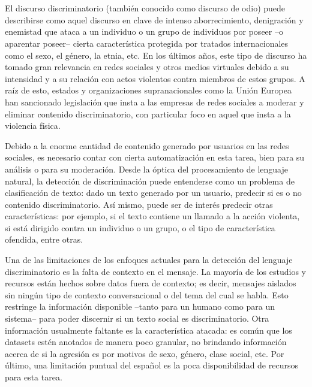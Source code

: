 \chapter*{\runtitulo}

\noindent El discurso discriminatorio (también conocido como discurso de odio) puede describirse como aquel discurso en clave de intenso aborrecimiento, denigración y enemistad que ataca a un individuo o un grupo de individuos por poseer –o aparentar poseer– cierta característica protegida por tratados internacionales como el sexo, el género, la etnia, etc. En los últimos años, este tipo de discurso ha tomado gran relevancia en redes sociales y otros medios virtuales debido a su intensidad y a su relación con actos violentos contra miembros de estos grupos. A raíz de esto, estados y organizaciones supranacionales como la Unión Europea han sancionado legislación que insta a las empresas de redes sociales a moderar y eliminar contenido discriminatorio, con particular foco en aquel que insta a la violencia física.

Debido a la enorme cantidad de contenido generado por usuarios en las redes sociales, es necesario contar con cierta automatización en esta tarea, bien para su análisis o para su moderación. Desde la óptica del procesamiento de lenguaje natural, la detección de discriminación puede entenderse como un problema de clasificación de texto: dado un texto generado por un usuario, predecir si es o no contenido discriminatorio. Así mismo, puede ser de interés predecir otras características: por ejemplo, si el texto contiene un llamado a la acción violenta, si está dirigido contra un individuo o un grupo, o el tipo de característica ofendida, entre otras.

Una de las limitaciones de los enfoques actuales para la detección del lenguaje discriminatorio es la falta de contexto en el mensaje. La mayoría de los estudios y recursos están hechos sobre datos fuera de contexto; es decir, mensajes aislados sin ningún tipo de contexto conversacional o del tema del cual se habla. Esto restringe la información disponible –tanto para un humano como para un sistema– para poder discernir si un texto social es discriminatorio. Otra información usualmente faltante es la característica atacada: es común que los datasets estén anotados de manera poco granular, no brindando información acerca de si la agresión es por motivos de sexo, género, clase social, etc. Por último, una limitación puntual del español es la poca disponibilidad de recursos para esta tarea.

